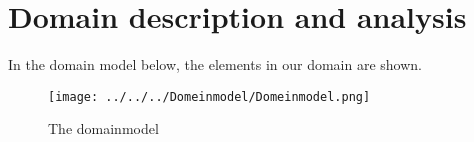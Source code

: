 
\section{Domain description and analysis}
In the domain model below, the elements in our domain are shown.
\begin{figure}[H]
	\centering
	\texttt{[image: ../../../Domeinmodel/Domeinmodel.png]}
	\caption{The domainmodel}
	\label{cd:domeinmodel}
\end{figure}
